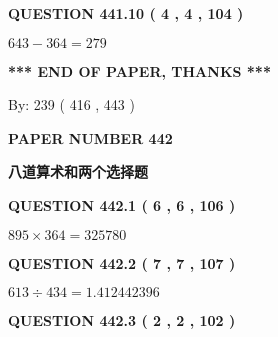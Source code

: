 \documentclass{ctexart}
\begin{document}
{\textbf{\Large{QUESTION
441.10 
 ( 4 , 4 , 104 )
}}}
  
  
 
 

$ %
643 -  %
364=   %
279$
 
 
   
   
 \vspace{0.2in}
 
   
   
   
   
\vspace{1.0in} 
{\textbf{\large{ *** END OF PAPER, THANKS *** }}} 
   
   
\hspace{1.0in} By: 
 239 ( 416 ,  443 )
   
   
   
   
\newpage 
\setcounter{page}{ 
   442001 } 
   
   
   
   
 {\textbf{ \Large{ PAPER NUMBER  442  }}}
   
   
\vspace{0.2in}
   
   
   
   
   
   
 \vspace{0.2in}
{\LARGE {\textbf{ 八道算术和两个选择题}}}
   
   
  
\vspace{0.2in}
  
{\textbf{\Large{QUESTION
442.1 
 ( 6 , 6 , 106 )
}}}
  
  
 
 

$ %
895 \times  %
364=   %
325780$
 
 
  
\vspace{0.2in}
  
{\textbf{\Large{QUESTION
442.2 
 ( 7 , 7 , 107 )
}}}
  
  
 
 

$ %
613 \div  %
434=   %
1.412442396$
 
 
  
\vspace{0.2in}
  
{\textbf{\Large{QUESTION
442.3 
 ( 2 , 2 , 102 )
}}}
  
\end{document}
